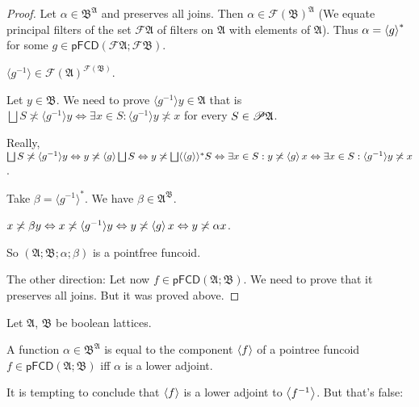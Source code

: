 \begin{proof}
  Let $\alpha \in \mathfrak{B}^{\mathfrak{A}}$ and preserves all joins. Then
  $\alpha \in \mathscr{F} (\mathfrak{B})^{\mathfrak{A}}$ (We equate principal
  filters of the set $\mathscr{F} \mathfrak{A}$ of filters on $\mathfrak{A}$
  with elements of $\mathfrak{A}$). Thus $\alpha = \left\langle g\right\rangle ^{\ast}$
  for some $g \in \mathsf{pFCD} \left( \mathscr{F} \mathfrak{A}; \mathscr{F}
  \mathfrak{B} \right)$.
  
  $\langle g^{- 1} \rangle \in \mathscr{F} (\mathfrak{A})^{\mathscr{F}
  (\mathfrak{B})}$.
  
  Let $y \in \mathfrak{B}$. We need to prove $\langle g^{- 1} \rangle y \in
  \mathfrak{A}$ that is $\bigsqcup S \nasymp \langle g^{- 1} \rangle y
  \Leftrightarrow \exists x \in S : \langle g^{- 1} \rangle y \nasymp x$ for
  every $S \in \mathscr{P} \mathfrak{A}$.
  
  Really, $\bigsqcup S \not\asymp \langle g^{- 1} \rangle y \Leftrightarrow y
  \not\asymp \left\langle g\right\rangle \bigsqcup S \Leftrightarrow y \not\asymp \bigsqcup
  \langle \left\langle g\right\rangle \rangle^{\ast} S \Leftrightarrow \exists x \in S :
  y \not\asymp \left\langle g\right\rangle x \Leftrightarrow \exists x \in S : \langle g^{-
  1} \rangle y \not\asymp x$.
  
  Take $\beta = \langle g^{- 1} \rangle^{\ast}$. We have $\beta \in
  \mathfrak{A}^{\mathfrak{B}}$.
  
  $x \not\asymp \beta y \Leftrightarrow x \not\asymp \langle g^{- 1} \rangle y
  \Leftrightarrow y \not\asymp \left\langle g\right\rangle x \Leftrightarrow y \not\asymp
  \alpha x$.
  
  So $(\mathfrak{A}; \mathfrak{B}; \alpha ; \beta)$ is a pointfree funcoid.
  
  The other direction: Let now $f \in \mathsf{pFCD} (\mathfrak{A};
  \mathfrak{B})$. We need to prove that it preserves all joins. But it was
  proved above.
\end{proof}

\begin{conjecture}
  Let $\mathfrak{A}$, $\mathfrak{B}$ be boolean lattices.
  
  A function $\alpha \in \mathfrak{B}^{\mathfrak{A}}$ is equal to the
  component $\left\langle f\right\rangle$ of a pointree funcoid $f \in \mathsf{pFCD}
  (\mathfrak{A}; \mathfrak{B})$ iff $\alpha$ is a lower adjoint.
\end{conjecture}

It is tempting to conclude that $\left\langle f\right\rangle$ is a lower adjoint to
$\left\langle f^{- 1}\right\rangle$. But that's false:

